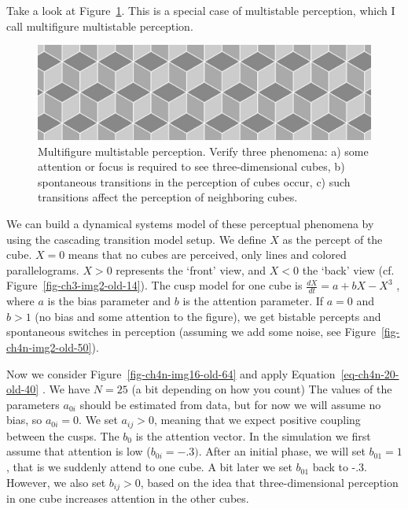 \documentclass[
  a4paper,
  DIV=11,
  numbers=noendperiod,
  oneside]{scrreprt}
\begin{document}
Take a look at Figure~\ref{fig-ch4n-img18-old-66}. This is a special
case of multistable perception, which I call multifigure multistable
perception.

\begin{figure}

{\centering \includegraphics{media/ch4n/image18.jpg}

}

\caption{\label{fig-ch4n-img18-old-66}Multifigure multistable
perception. Verify three phenomena: a) some attention or focus is
required to see three-dimensional cubes, b) spontaneous transitions in
the perception of cubes occur, c) such transitions affect the perception
of neighboring cubes.}

\end{figure}

We can build a dynamical systems model of these perceptual phenomena by
using the cascading transition model setup. We define \(X\) as the
percept of the cube. \(X = 0\) means that no cubes are perceived, only
lines and colored parallelograms. \(X > 0\) represents the `front' view,
and \(X < 0\) the `back' view (cf. Figure~\ref{fig-ch3-img2-old-14}).
The cusp model for one cube is \(\frac{dX}{dt} = {a + bX - X}^{3}\) ,
where \(a\) is the bias parameter and \(b\) is the attention parameter.
If \(a = 0\) and \(b > 1\) (no bias and some attention to the figure),
we get bistable percepts and spontaneous switches in perception
(assuming we add some noise, see Figure~\ref{fig-ch4n-img2-old-50}).

Now we consider Figure~\ref{fig-ch4n-img16-old-64} and apply
Equation~\ref{eq-ch4n-20-old-40} . We have \(N = 25\) (a bit depending
on how you count) The values of the parameters \(a_{0i}\) should be
estimated from data, but for now we will assume no bias, so
\(a_{0i} = 0\). We set \(a_{ij} > 0\), meaning that we expect positive
coupling between the cusps. The \(b_{0}\) is the attention vector. In
the simulation we first assume that attention is low
(\(b_{0i} = - .3)\). After an initial phase, we will set \(b_{01} = 1\),
that is we suddenly attend to one cube. A bit later we set \(b_{01}\)
back to -.3. However, we also set \(b_{ij} > 0\), based on the idea that
three-dimensional perception in one cube increases attention in the
other cubes.
\end{document}
